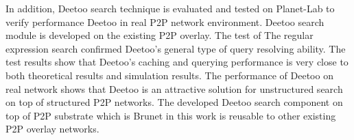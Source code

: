 \documentclass[9.5pt,journal,final,finalsubmission,twocolumn]{IEEEtran}
\begin{document}
In addition, Deetoo search technique is evaluated and tested on Planet-Lab
to verify performance Deetoo in real P2P network environment.
Deetoo search module is developed on the existing P2P overlay.
The test of The regular expression search confirmed Deetoo's general type of query
resolving ability.
The test results show that Deetoo's caching and querying performance
is very close to both theoretical results and simulation results.
The performance of Deetoo on real network shows that Deetoo is an attractive 
solution for unstructured search on top of structured P2P networks.
The developed Deetoo search component on top of P2P substrate which is Brunet 
in this work is reusable to other existing P2P overlay networks.




\end{document}
